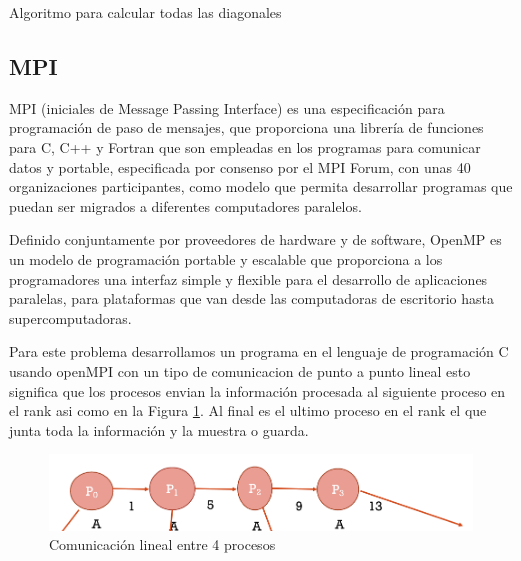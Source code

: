 \documentclass[10pt]{IEEEtran}
\begin{document}
\begin{algorithm}
  \SetAlgoLined
  \caption{Algoritmo para calcular todas las diagonales}
  \label{algoFinal}
\end{algorithm}

\subsection{MPI}
MPI (iniciales de Message Passing Interface) es una especificación para programación de paso de mensajes, que proporciona una librería de funciones para C, C++ y Fortran que son empleadas en los programas para comunicar datos y portable, especificada por consenso por el MPI Forum, con unas 40 organizaciones participantes, como modelo que permita desarrollar programas que puedan ser migrados a diferentes computadores paralelos.

Definido conjuntamente por proveedores de hardware y de software, OpenMP es un modelo de programación portable y escalable que proporciona a los programadores una interfaz simple y flexible para el desarrollo de aplicaciones paralelas, para plataformas que van desde las computadoras de escritorio hasta supercomputadoras.

Para este problema desarrollamos un programa en el lenguaje de programación C usando openMPI con un tipo de comunicacion de punto a punto lineal esto significa que los procesos envian la información procesada al siguiente proceso en el rank asi como en la Figura \ref{fig:lineal}. Al final es el ultimo proceso en el rank el que junta toda la información y la muestra o guarda.

\begin{figure}
  \centering
  \includegraphics[width=0.8\linewidth]{lineal.png}
  \caption{Comunicación lineal entre 4 procesos}
  \label{fig:lineal}
\end{figure}
\end{document}
